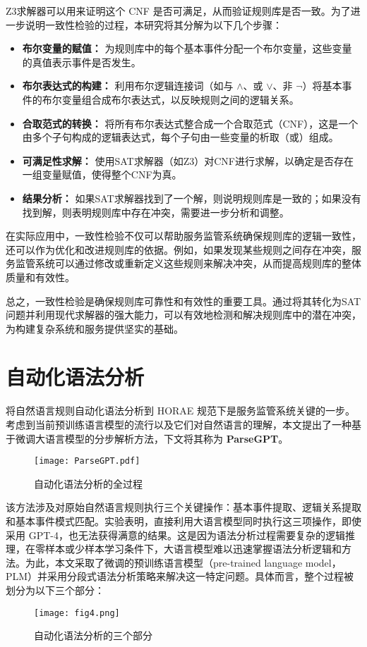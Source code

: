 Z3求解器可以用来证明这个 CNF 是否可满足，从而验证规则库是否一致。为了进一步说明一致性检验的过程，本研究将其分解为以下几个步骤：

\begin{itemize}
    \item \textbf{布尔变量的赋值：} 为规则库中的每个基本事件分配一个布尔变量，这些变量的真值表示事件是否发生。
    \item \textbf{布尔表达式的构建：} 利用布尔逻辑连接词（如与 $\land$、或 $\lor$、非 $\neg$）将基本事件的布尔变量组合成布尔表达式，以反映规则之间的逻辑关系。
    \item \textbf{合取范式的转换：} 将所有布尔表达式整合成一个合取范式（CNF），这是一个由多个子句构成的逻辑表达式，每个子句由一些变量的析取（或）组成。
    \item \textbf{可满足性求解：} 使用SAT求解器（如Z3）对CNF进行求解，以确定是否存在一组变量赋值，使得整个CNF为真。
    \item \textbf{结果分析：} 如果SAT求解器找到了一个解，则说明规则库是一致的；如果没有找到解，则表明规则库中存在冲突，需要进一步分析和调整。
\end{itemize}

在实际应用中，一致性检验不仅可以帮助服务监管系统确保规则库的逻辑一致性，还可以作为优化和改进规则库的依据。例如，如果发现某些规则之间存在冲突，服务监管系统可以通过修改或重新定义这些规则来解决冲突，从而提高规则库的整体质量和有效性。

总之，一致性检验是确保规则库可靠性和有效性的重要工具。通过将其转化为SAT问题并利用现代求解器的强大能力，可以有效地检测和解决规则库中的潜在冲突，为构建复杂系统和服务提供坚实的基础。

\newpage

\section{自动化语法分析}\label{自动化语法分析}

将自然语言规则自动化语法分析到 HORAE 规范下是服务监管系统关键的一步。考虑到当前预训练语言模型的流行以及它们对自然语言的理解，本文提出了一种基于微调大语言模型的分步解析方法，下文将其称为 \textbf{ParseGPT}。

\begin{figure*}[ht]
\centering
\texttt{[image: ParseGPT.pdf]}
\caption{自动化语法分析的全过程}
\end{figure*}
该方法涉及对原始自然语言规则执行三个关键操作：基本事件提取、逻辑关系提取和基本事件模式匹配。实验表明，直接利用大语言模型同时执行这三项操作，即使采用 GPT-4\cite{achiam2023gpt}，也无法获得满意的结果。这是因为语法分析过程需要复杂的逻辑推理，在零样本或少样本学习条件下，大语言模型难以迅速掌握语法分析逻辑和方法。为此，本文采取了微调的预训练语言模型\cite{edunov2019pre}（pre-trained language
model，PLM）并采用分段式语法分析策略来解决这一特定问题。具体而言，整个过程被划分为以下三个部分：
\begin{figure*}[ht]
    \centering
    \texttt{[image: fig4.png]}
    \caption{自动化语法分析的三个部分}
    \label{fig111}
    \end{figure*}
